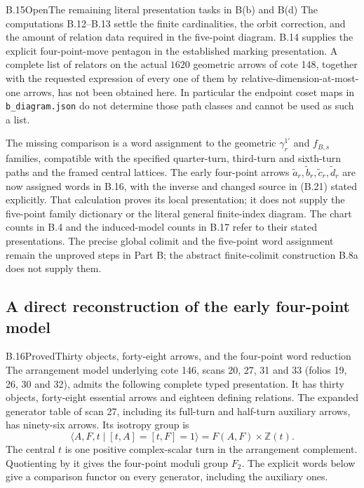 \begin{result}{B.15}{Open}{The remaining literal presentation tasks in B(b) and B(d)}
The computations B.12--B.13 settle the finite cardinalities,
the orbit correction, and the amount of relation data required
in the five-point diagram.  B.14 supplies the explicit
four-point-move pentagon in the established marking presentation.
A complete list of relators on the actual $1620$ geometric arrows
of cote 148, together with the requested expression of every
one of them by relative-dimension-at-most-one arrows, has not
been obtained here.  In particular the endpoint coset maps in
\texttt{b\_diagram.json} do not determine those path classes and
cannot be used as such a list.

The missing comparison is a word assignment to the geometric
$\gamma_r^{1'}$ and $f_{B,s}$ families, compatible with the
specified quarter-turn, third-turn and sixth-turn paths and the
framed central lattices.  The early four-point arrows
$\widetilde a_r,\widetilde b_r,\widetilde c_r,\widetilde d_r$
are now assigned words in B.16, with the inverse and changed source
in (B.21) stated explicitly.  That calculation proves its local
presentation; it does not supply the five-point family dictionary
or the literal general finite-index diagram.  The chart counts in
B.4 and the induced-model counts in B.17 refer to their stated
presentations.  The precise global colimit and the five-point word
assignment remain the unproved steps in Part B; the abstract
finite-colimit construction B.8a does not supply them.
\end{result}

\subsection{A direct reconstruction of the early four-point model}

\begin{result}{B.16}{Proved}{Thirty objects, forty-eight arrows, and the four-point word reduction}
The arrangement model underlying cote 146, scans 20, 27, 31 and
33 (folios 19, 26, 30 and 32), admits the following complete typed
presentation.  It has thirty objects, forty-eight essential
arrows and eighteen defining relations.  The expanded generator
table of scan 27, including its full-turn and half-turn auxiliary
arrows, has ninety-six arrows.  Its isotropy group is
\[
 \langle A,F,t\mid[t,A]=[t,F]=1\rangle=F(A,F)\times\mathbb Z(t).
 \tag{B.19}
\]
The central $t$ is one positive complex-scalar turn in the
arrangement complement.  Quotienting by it gives the four-point
moduli group $F_2$.  The explicit words below give a comparison
functor on every generator, including the auxiliary ones.
\end{result}

